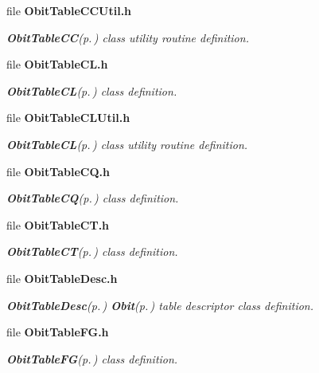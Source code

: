 \begin{CompactItemize}
\item 
file {\bf Obit\-Table\-CCUtil.h}
\begin{CompactList}\small\item\em {\bf Obit\-Table\-CC}{\rm (p.\,\pageref{structObitTableCC})} class utility routine definition. \item\end{CompactList}

\item 
file {\bf Obit\-Table\-CL.h}
\begin{CompactList}\small\item\em {\bf Obit\-Table\-CL}{\rm (p.\,\pageref{structObitTableCL})} class definition. \item\end{CompactList}

\item 
file {\bf Obit\-Table\-CLUtil.h}
\begin{CompactList}\small\item\em {\bf Obit\-Table\-CL}{\rm (p.\,\pageref{structObitTableCL})} class utility routine definition. \item\end{CompactList}

\item 
file {\bf Obit\-Table\-CQ.h}
\begin{CompactList}\small\item\em {\bf Obit\-Table\-CQ}{\rm (p.\,\pageref{structObitTableCQ})} class definition. \item\end{CompactList}

\item 
file {\bf Obit\-Table\-CT.h}
\begin{CompactList}\small\item\em {\bf Obit\-Table\-CT}{\rm (p.\,\pageref{structObitTableCT})} class definition. \item\end{CompactList}

\item 
file {\bf Obit\-Table\-Desc.h}
\begin{CompactList}\small\item\em {\bf Obit\-Table\-Desc}{\rm (p.\,\pageref{structObitTableDesc})} {\bf Obit}{\rm (p.\,\pageref{structObit})} table descriptor class definition. \item\end{CompactList}

\item 
file {\bf Obit\-Table\-FG.h}
\begin{CompactList}\small\item\em {\bf Obit\-Table\-FG}{\rm (p.\,\pageref{structObitTableFG})} class definition. \item\end{CompactList}


\end{CompactItemize}
